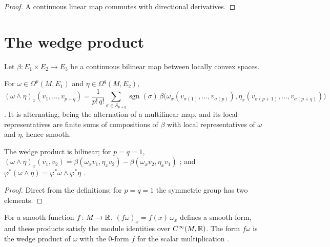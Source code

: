 \begin{proof}
  \leanok
  A continuous linear map commutes with directional derivatives.
\end{proof}

\section{The wedge product}

Let $\beta \colon E_1 \times E_2 \to E_3$ be a continuous bilinear map between locally convex
spaces.

\begin{definition}
  \label{def:wedge}
  \leanok
  For $\omega \in \Omega^p(M, E_1)$ and $\eta \in \Omega^q(M, E_2)$,
  \[
    (\omega \wedge \eta)_x(v_1, \dots, v_{p+q}) = \frac{1}{p!\,q!}
      \sum_{\sigma \in S_{p+q}} \operatorname{sgn}(\sigma)\,
      \beta\bigl(\omega_x(v_{\sigma(1)}, \dots, v_{\sigma(p)}),
        \eta_x(v_{\sigma(p+1)}, \dots, v_{\sigma(p+q)})\bigr)
  \]
  \cite[Definition~3.6.3]{GN26}. It is alternating, being the alternation of a multilinear map,
  and its local representatives are finite sums of compositions of $\beta$ with local
  representatives of $\omega$ and $\eta$, hence smooth.
\end{definition}

\begin{proposition}
  \label{prop:wedge-properties}
  \leanok
  The wedge product is bilinear; for $p = q = 1$,
  $(\omega \wedge \eta)_x(v_1, v_2) = \beta(\omega_x v_1, \eta_x v_2) - \beta(\omega_x v_2,
  \eta_x v_1)$ \cite[Definition~3.6.3]{GN26}; and $\varphi^*(\omega \wedge \eta) =
  \varphi^*\omega \wedge \varphi^*\eta$ \cite[(3.28)]{GN26}.
\end{proposition}

\begin{proof}
  \leanok
  Direct from the definitions; for $p = q = 1$ the symmetric group has two elements.
\end{proof}

\begin{proposition}
  \label{prop:smul-fun}
  \leanok
  For a smooth function $f \colon M \to \mathbb{R}$, $(f\omega)_x = f(x)\,\omega_x$ defines a smooth form,
  and these products satisfy the module identities over $C^\infty(M, \mathbb{R})$. The form $f\omega$ is
  the wedge product of $\omega$ with the $0$-form $f$ for the scalar multiplication
  \cite[Remark~3.6.5]{GN26}.
\end{proposition}

